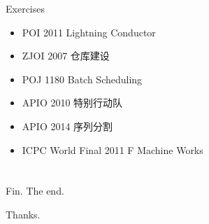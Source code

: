 \documentclass[9pt,dvipsnames,table,UTF8,aspectratio=169]{beamer}
\begin{document}
\begin{frame}{Exercises}
	\begin{itemize}
		\item POI 2011 Lightning Conductor
		\item ZJOI 2007 仓库建设
		\item POJ 1180 Batch Scheduling
		\item APIO 2010 特别行动队
		\item APIO 2014 序列分割
		\item ICPC World Final 2011 F Machine Works
	\end{itemize}
\end{frame}
\appendix
\section{}
\begin{frame}{Fin.}
	The end.

	Thanks.
\end{frame}
\end{document}
